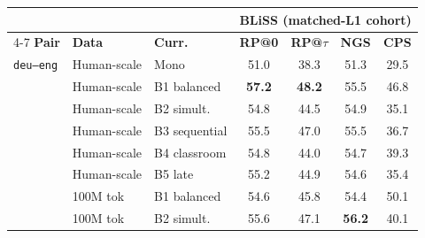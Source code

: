 \begin{table}[t]
\centering\scriptsize
\setlength{\tabcolsep}{3pt}
\begin{minipage}[t]{0.49\linewidth}\centering
\begin{tabular}{ll l cccc}
\toprule
& & & \multicolumn{4}{c}{\textbf{BLiSS (matched-L1 cohort)}} \\
\cmidrule(lr){4-7}
\textbf{Pair} & \textbf{Data} & \textbf{Curr.} & \textbf{RP@0} & \textbf{RP@$\tau$} & \textbf{NGS} & \textbf{CPS} \\
\midrule
\texttt{deu--eng} & Human-scale & Mono & \cellcolor[rgb]{0.990,1.000,0.990} 51.0 & \cellcolor[rgb]{1.000,0.887,0.887} 38.3 & \cellcolor[rgb]{0.983,1.000,0.983} 51.3 & \cellcolor[rgb]{1.000,0.774,0.774} 29.5 \\
 & Human-scale & B1 balanced & \cellcolor[rgb]{0.925,1.000,0.925} \textbf{57.2} & \cellcolor[rgb]{1.000,0.983,0.983} \textbf{48.2} & \cellcolor[rgb]{0.927,1.000,0.927} 55.5 & \cellcolor[rgb]{1.000,0.965,0.965} 46.8 \\
 & Human-scale & B2 simult. & \cellcolor[rgb]{0.950,1.000,0.950} 54.8 & \cellcolor[rgb]{1.000,0.947,0.947} 44.5 & \cellcolor[rgb]{0.935,1.000,0.935} 54.9 & \cellcolor[rgb]{1.000,0.836,0.836} 35.1 \\
 & Human-scale & B3 sequential & \cellcolor[rgb]{0.943,1.000,0.943} 55.5 & \cellcolor[rgb]{1.000,0.971,0.971} 47.0 & \cellcolor[rgb]{0.927,1.000,0.927} 55.5 & \cellcolor[rgb]{1.000,0.853,0.853} 36.7 \\
 & Human-scale & B4 classroom & \cellcolor[rgb]{0.950,1.000,0.950} 54.8 & \cellcolor[rgb]{1.000,0.942,0.942} 44.0 & \cellcolor[rgb]{0.938,1.000,0.938} 54.7 & \cellcolor[rgb]{1.000,0.882,0.882} 39.3 \\
 & Human-scale & B5 late & \cellcolor[rgb]{0.946,1.000,0.946} 55.2 & \cellcolor[rgb]{1.000,0.951,0.951} 44.9 & \cellcolor[rgb]{0.939,1.000,0.939} 54.6 & \cellcolor[rgb]{1.000,0.839,0.839} 35.4 \\
\addlinespace[1.5pt]
 & 100M tok & B1 balanced & \cellcolor[rgb]{0.952,1.000,0.952} 54.6 & \cellcolor[rgb]{1.000,0.960,0.960} 45.8 & \cellcolor[rgb]{0.942,1.000,0.942} 54.4 & \cellcolor[rgb]{0.998,1.000,0.998} 50.1 \\
 & 100M tok & B2 simult. & \cellcolor[rgb]{0.942,1.000,0.942} 55.6 & \cellcolor[rgb]{1.000,0.972,0.972} 47.1 & \cellcolor[rgb]{0.918,1.000,0.918} \textbf{56.2} & \cellcolor[rgb]{1.000,0.891,0.891} 40.1 \\

\end{tabular}
\end{minipage}
\end{table}
